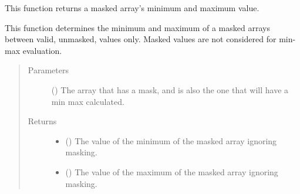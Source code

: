 \documentclass[letterpaper,10pt,english]{sphinxmanual}
\begin{document}
\begin{fulllineitems}
\label{\detokenize{python_docstrings/IfA_Smeargle.meta.fits_and_arrays:IfA_Smeargle.meta.fits_and_arrays.smeargle_masked_array_min_max}}
This function returns a masked array’s minimum and maximum value.

This function determines the minimum and maximum of a masked arrays
between valid, unmasked, values only. Masked values are not considered
for min-max evaluation.
\begin{quote}\begin{description}
\item[{Parameters}] \leavevmode
{} () \textendash{} The array that has a mask, and is also the one that will have a
min max calculated.

\item[{Returns}] \leavevmode
\begin{itemize}
\item {} 
 () \textendash{} The value of the minimum of the masked array ignoring masking.

\item {} 
 () \textendash{} The value of the maximum of the masked array ignoring masking.

\end{itemize}


\end{description}\end{quote}

\end{fulllineitems}

\end{document}
